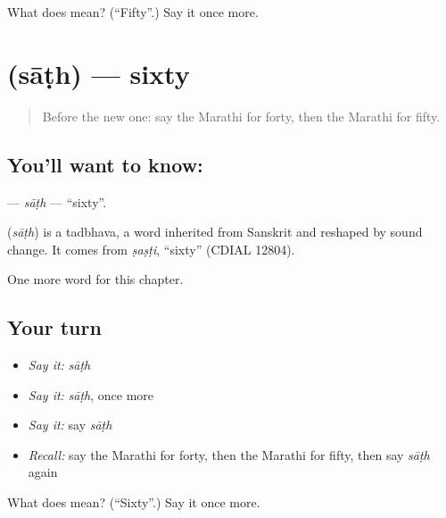 \begin{tcolorbox}[breakable,colback=teal!4,colframe=teal!35!black,title={Before you move on}]
What does  mean? (\textquotedblleft{}Fifty\textquotedblright{}.) Say it once more.
\end{tcolorbox}
\section[\texorpdfstring{\mr{साठ} (sāṭh)}{साठ (sāṭh)}]{ (sāṭh) — sixty}

\label{lesson:MR-C118-sath}



\begin{quote}
Before the new one: say the Marathi for forty, then the Marathi for fifty.
\end{quote}

\subsection*{You'll want to know: }
\textbf{} — \emph{sāṭh} — \textquotedblleft{}sixty\textquotedblright{}.

\begin{cousinweb}
\textbf{} (\emph{sāṭh}) is a tadbhava, a word inherited from Sanskrit and reshaped by sound change. It comes from \emph{ṣaṣṭi}, \textquotedblleft{}sixty\textquotedblright{} (CDIAL 12804).
\end{cousinweb}

\begin{grammarlens}[title={What you've built}]
One more word for this chapter.
\end{grammarlens}

\subsection*{Your turn}
\begin{itemize}
\raggedright
  \item \emph{Say it:} \emph{sāṭh}
  \item \emph{Say it:} \emph{sāṭh}, once more
  \item \emph{Say it:} say \emph{sāṭh}
  \item \emph{Recall:} say the Marathi for forty, then the Marathi for fifty, then say \emph{sāṭh} again
\end{itemize}

\begin{tcolorbox}[breakable,colback=teal!4,colframe=teal!35!black,title={Before you move on}]
What does  mean? (\textquotedblleft{}Sixty\textquotedblright{}.) Say it once more.
\end{tcolorbox}
